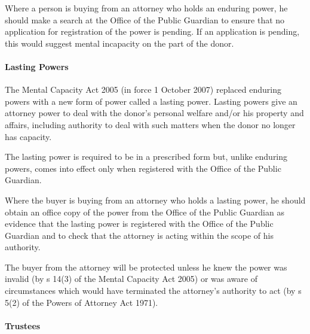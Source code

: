 \documentclass[
]{article}
\newenvironment{Shaded}{}{}
\newcommand{\NormalTok}[1]{#1}
\begin{document}
\begin{Shaded}
\begin{Highlighting}[]
\NormalTok{Where a person is buying from an attorney who holds an enduring power, he should make a search at the Office of the Public Guardian to ensure that no application for registration of the power is pending. If an application is pending, this would suggest mental incapacity on the part of the donor.}
\end{Highlighting}
\end{Shaded}

\hypertarget{lasting-powers}{%
\paragraph{Lasting Powers}\label{lasting-powers}}

\begin{Shaded}
\begin{Highlighting}[]
\NormalTok{The Mental Capacity Act 2005 (in force 1 October 2007) replaced enduring powers with a new form of power called a lasting power. Lasting powers give an attorney power to deal with the donor’s personal welfare and/or his property and affairs, including authority to deal with such matters when the donor no longer has capacity.}
\end{Highlighting}
\end{Shaded}

The lasting power is required to be in a prescribed form but, unlike
enduring powers, comes into effect only when registered with the Office
of the Public Guardian.

\begin{Shaded}
\begin{Highlighting}[]
\NormalTok{Where the buyer is buying from an attorney who holds a lasting power, he should obtain an office copy of the power from the Office of the Public Guardian as evidence that the lasting power is registered with the Office of the Public Guardian and to check that the attorney is acting within the scope of his authority.}

\NormalTok{The buyer from the attorney will be protected unless he knew the power was invalid (by s 14(3) of the Mental Capacity Act 2005) or was aware of circumstances which would have terminated the attorney’s authority to act (by s 5(2) of the Powers of Attorney Act 1971).}
\end{Highlighting}
\end{Shaded}

\hypertarget{trustees}{%
\paragraph{Trustees}\label{trustees}}
\end{document}
